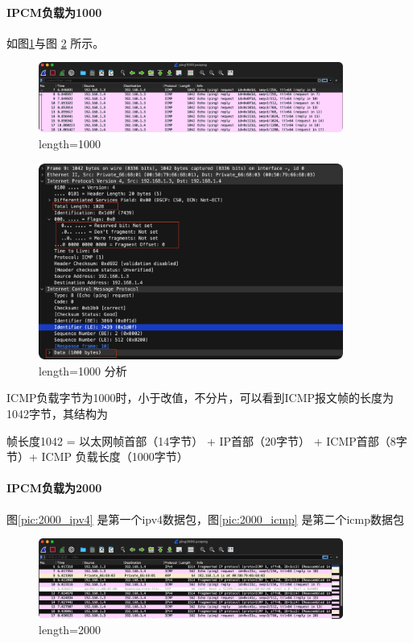 \documentclass[a4paper,12pt]{report}
\begin{document}
\begin{spacing}{1.5}
\paragraph{IPCM负载为1000}

如图\ref{pic:1000}与图 \ref{pic:1000data} 所示。

\begin{figure}[htb!]
  \centering
\includegraphics[width=10cm]{figure/ping1000.png}
\caption{length=1000}
\label{pic:1000}
\end{figure}


\begin{figure}[htb!]
  \centering
\includegraphics[width=10cm]{figure/ping1000_data.png}
\caption{length=1000 分析}
\label{pic:1000data}
\end{figure}


ICMP负载字节为1000时，小于改值，不分片，可以看到ICMP报文帧的长度为1042字节，其结构为

帧长度1042 = 以太网帧首部（14字节） + IP首部（20字节） + ICMP首部（8字节）+ ICMP 负载长度（1000字节）


\paragraph{IPCM负载为2000}

图\ref{pic:2000_ipv4} 是第一个ipv4数据包，图\ref{pic:2000_icmp} 是第二个icmp数据包

\begin{figure}[htb!]
  \centering
\includegraphics[width=10cm]{figure/ping2000.png}
\caption{length=2000}
\label{pic:2000}
\end{figure}



\end{spacing}
\end{document}
